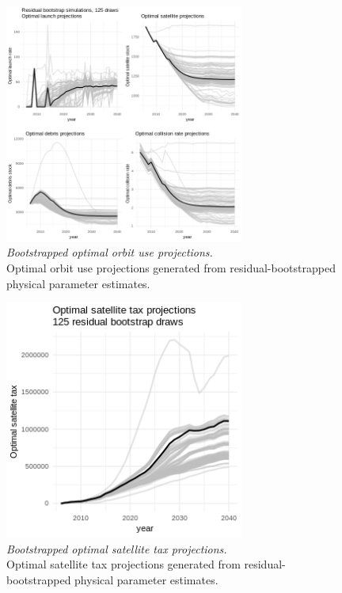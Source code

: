 \documentclass[12pt]{article}
\begin{document}
\begin{figure}[H]
	\centering
	\includegraphics[width=0.7\textwidth]{../../images/bootstrapped_optimal_simulation_plot.png}
	\captionsetup{format=hang}
	\caption[Bootstrapped optimal orbit use projections]{\textit{Bootstrapped optimal orbit use projections.} \\
		Optimal orbit use projections generated from residual-bootstrapped physical parameter estimates.
	}
	\label{optimal_projection_bootstrap}
\end{figure}

\begin{figure}[H]
	\centering
	\includegraphics[width=0.7\textwidth]{../../images/bootstrapped_optimal_sattax_projection.png}
	\captionsetup{format=hang}
	\caption[Bootstrapped optimal satellite tax projections]{\textit{Bootstrapped optimal satellite tax projections.} \\
		Optimal satellite tax projections generated from residual-bootstrapped physical parameter estimates.
	}
	\label{optimal_sattax_bootstrap}
\end{figure}
\end{document}
